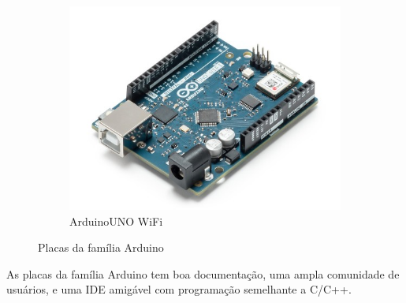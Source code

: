 \documentclass{beamer}
\begin{document}
\begin{frame}
\begin{minipage}{\textwidth}
\begin{figure}
		\begin{subfigure}[b]{0.25\textwidth}
			\includegraphics[width=\textwidth]{arduinoUNO_wifi.jpg}
			\caption{ArduinoUNO WiFi}
			\label{fig:nofdfdde_mfdfdcudfd}
		\end{subfigure}
		\caption{Placas da família Arduino}
		\label{fig:plfdacddsfa_iot}
		\vspace{-10pt}
	\end{figure}
	As placas da família Arduino tem boa documentação, uma ampla comunidade de usuários, e uma IDE amigável com programação semelhante a C/C++.
	
\end{minipage}
\end{frame}
\end{document}
